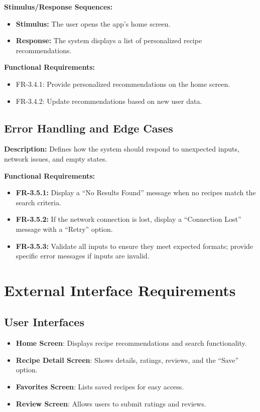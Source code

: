 \documentclass[12pt]{article}
\begin{document}
\textbf{Stimulus/Response Sequences:}
\begin{itemize}
    \item \textbf{Stimulus:} The user opens the app’s home screen.
    \item \textbf{Response:} The system displays a list of personalized recipe recommendations.
\end{itemize}

\textbf{Functional Requirements:}
\begin{itemize}
    \item FR-3.4.1: Provide personalized recommendations on the home screen.
    \item FR-3.4.2: Update recommendations based on new user data.
\end{itemize}

\subsection{Error Handling and Edge Cases}
\textbf{Description:} Defines how the system should respond to unexpected inputs, network issues, and empty states.

\textbf{Functional Requirements:}
\begin{itemize}
    \item \textbf{FR-3.5.1:} Display a “No Results Found” message when no recipes match the search criteria.
    \item \textbf{FR-3.5.2:} If the network connection is lost, display a “Connection Lost” message with a “Retry” option.
    \item \textbf{FR-3.5.3:} Validate all inputs to ensure they meet expected formats; provide specific error messages if inputs are invalid.
\end{itemize}

\newpage
\section{External Interface Requirements}

\subsection{User Interfaces}
\begin{itemize}
    \item \textbf{Home Screen}: Displays recipe recommendations and search functionality.
    \item \textbf{Recipe Detail Screen}: Shows details, ratings, reviews, and the “Save” option.
    \item \textbf{Favorites Screen}: Lists saved recipes for easy access.
    \item \textbf{Review Screen}: Allows users to submit ratings and reviews.
\end{itemize}
\end{document}
